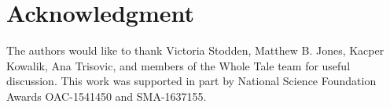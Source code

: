 
\section*{Acknowledgment}
The authors would like to thank Victoria Stodden, Matthew B. Jones,
Kacper Kowalik, Ana Trisovic, and members of the Whole Tale team for useful discussion.
This work was supported in part by National Science Foundation Awards
OAC-1541450 and SMA-1637155.

